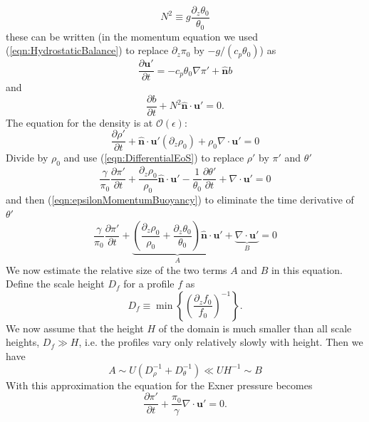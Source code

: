 \documentclass[10pt]{article}
\newcommand{\order}{\mathcal{O}}
\renewcommand{\vec}[1]{\boldsymbol{#1}}
\begin{document}
\begin{equation}
  N^2 \equiv g\frac{\partial_z \theta_0}{\theta_0}
\end{equation}
these can be written (in the momentum equation we used (\ref{eqn:HydrostaticBalance}) to replace $\partial_z\pi_0$ by $-g/(c_p\theta_0)$) as
\begin{equation}
  \frac{\partial\vec{u}'}{\partial t} = -c_p\theta_0 \nabla\pi' + \hat{\vec{n}} b
\end{equation}
and
\begin{equation}
  \frac{\partial b}{\partial t} + N^2 \hat{\vec{n}}\cdot\vec{u}' = 0.
  \label{eqn:BuoyancyEquation}
\end{equation}
The equation for the density is at $\order(\epsilon)$:
\begin{equation}
  \frac{\partial\rho'}{\partial t} + \hat{\vec{n}}\cdot\vec{u}'(\partial_z \rho_0) + \rho_0\nabla\cdot\vec{u}' = 0
\end{equation}
Divide by $\rho_0$ and use (\ref{eqn:DifferentialEoS}) to replace $\rho'$ by $\pi'$ and $\theta'$
\begin{equation}
  \frac{\gamma}{\pi_0}\frac{\partial \pi'}{\partial t} 
+ \frac{\partial_z\rho_0}{\rho_0} \hat{\vec{n}}\cdot\vec{u}'-\frac{1}{\theta_0}\frac{\partial \theta'}{\partial t} + \nabla\cdot \vec{u}' = 0
\end{equation}
and then (\ref{eqn:epsilonMomentumBuoyancy}) to eliminate the time derivative of $\theta'$
\begin{equation}
  \frac{\gamma}{\pi_0}\frac{\partial \pi'}{\partial t} 
+ \underbrace{\left(\frac{\partial_z\rho_0}{\rho_0}+\frac{\partial_z \theta_0}{\theta_0}\right) \hat{\vec{n}}\cdot\vec{u}'}_{A}+ \underbrace{\nabla\cdot \vec{u}'}_{B} = 0
\end{equation}
We now estimate the relative size of the two terms $A$ and $B$ in this equation. Define the scale height $D_f$ for a profile $f$ as
\begin{equation}
  D_f \equiv \min\left\{\left(\frac{\partial_z f_0}{f_0}\right)^{-1}\right\}.
\end{equation}
We now assume that the height $H$ of the domain is much smaller than all scale heights, $D_f\gg H$, i.e. the profiles vary only relatively slowly with height. Then we have 
\begin{equation}
  A \sim U\left(D_\rho^{-1}+D_\theta^{-1}\right) \ll UH^{-1} \sim B
\end{equation}
With this approximation the equation for the Exner pressure becomes
\begin{equation}
  \frac{\partial\pi'}{\partial t} + \frac{\pi_0}{\gamma}\nabla\cdot\vec{u}' = 0.
\end{equation}
\end{document}
